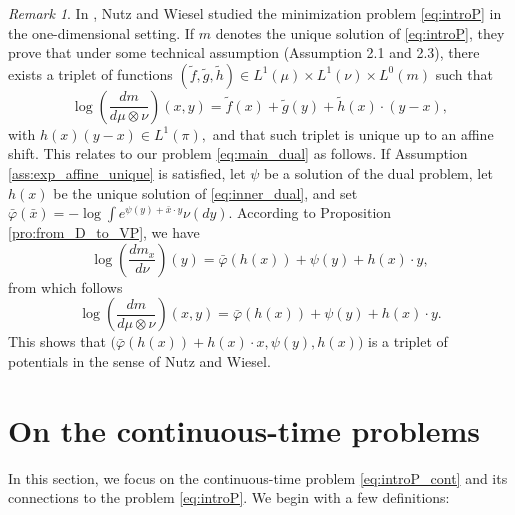 \documentclass[reqno, a4paper]{amsart}
\theoremstyle{plain}
\theoremstyle{definition}
\theoremstyle{remark}
\newtheorem{remark}[theorem]{Remark}
\numberwithin{equation}{section}
\numberwithin{theorem}{section}
\begin{document}
	
	\begin{remark}
		In \cite{NuWi24}, Nutz and Wiesel studied the minimization problem \eqref{eq:introP} in the one-dimensional setting. If $m$ denotes the unique solution of \eqref{eq:introP}, they prove that under some technical assumption (Assumption 2.1 and 2.3), there exists a triplet of functions $(\tilde f, \tilde g, \tilde h) \in L^1(\mu) \times L^1(\nu) \times L^0(m)$ such that $$\log\left(\frac{d m}{d \mu \otimes \nu}\right)(x,y) = \tilde f (x) + \tilde g (y) + \tilde h (x) \cdot (y-x),$$ with $h(x)(y-x) \in L^1(\pi),$ and that such triplet is unique up to an affine shift. This relates to our problem \eqref{eq:main_dual} as follows. If Assumption \ref{ass:exp_affine_unique} is satisfied, let $\psi$ be a solution of the dual problem, let $h(x)$ be the unique solution of \eqref{eq:inner_dual}, and set $\bar \varphi(\bar x) = - \log \int e^{\psi(y)+ \bar x \cdot y} \nu(dy)$. According to Proposition \ref{pro:from_D_to_VP}, we have $$\log \left(\frac{d m_x}{d\nu}\right)(y) = {\bar \varphi(h(x)) + \psi(y) + h(x)\cdot y},$$ from which follows 
		\begin{equation} \label{eq:density_mart_opt}
			\log\left(\frac{dm}{d\mu \otimes \nu}\right)(x,y) = {\bar \varphi(h(x)) + \psi(y) + h(x) \cdot y}.
		\end{equation} This shows that $\big(\bar \varphi(h(x))+ h(x) \cdot x, \psi(y),h(x)\big)$ is a triplet of potentials in the sense of Nutz and Wiesel.
	\end{remark}
	
	
	\section{On the continuous-time problems }
	\label{sec:continuous}
	
	
	In this section, we focus on the continuous-time problem \eqref{eq:introP_cont} and its connections to the problem \eqref{eq:introP}. We begin with a few definitions:
	
\end{document}
